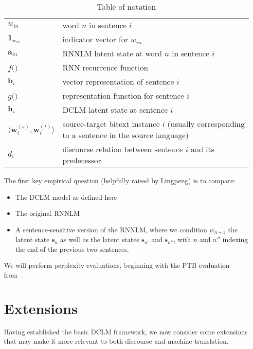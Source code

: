 \documentclass[11pt,a4paper]{article}
\renewcommand{\vec}[1]{\mathbf{#1}}
\newcommand{\vs}[0]{\vec{s}}
\newcommand{\vh}[0]{\vec{h}}
\newcommand{\vw}[0]{\vec{w}}
\newcommand{\vwt}[0]{\vw^{(t)}}
\newcommand{\vws}[0]{\vw^{(s)}}
\newcommand{\va}[0]{\vec{a}}
\newcommand{\vb}[0]{\vec{b}}
\newcommand{\tuple}[1]{\langle #1 \rangle}
\begin{document}
\begin{table}
  \centering
  \small
  \begin{tabular}{lp{2in}}
    \toprule
    $w_{in}$ & word $n$ in sentence $i$ \\
    $\vec{1}_{w_{in}}$ & indicator vector for $w_{in}$ \\
    $\va_{in}$ & RNNLM latent state at word $n$ in sentence $i$\\
    $f(\dot)$ & RNN recurrence function \\
    $\vb_i$ & vector representation of sentence $i$ \\
    $g(\dot)$ & representation function for sentence $i$\\
    $\vh_i$ & DCLM latent state at sentence $i$\\
    $\tuple{\vws_i, \vwt_i}$ & source-target bitext instance $i$ (usually corresponding to a sentence in the source language)\\
    $d_i$ & discourse relation between sentence $i$ and its predecessor\\
\bottomrule
  \end{tabular}
  \caption{Table of notation}
  \label{tab:notation}
\end{table}

The first key empirical question (helpfully raised by Lingpeng) is to compare:
\begin{itemize}
\item The DCLM model as defined here
\item The original RNNLM
\item A sentence-sensitive version of the RNNLM, where we condition $w_{n+1}$ the latent state $\vs_n$ as well as the latent states $\vs_{n'}$ and $\vs_{n''}$, with $n$ and $n''$ indexing the end of the previous two sentences.
\end{itemize}

We will perform perplexity evaluations, beginning with the PTB evaluation from~.

\section{Extensions}
Having established the basic DCLM framework, we now consider some extensions that may make it more relevant to both discourse and machine translation.
\end{document}
